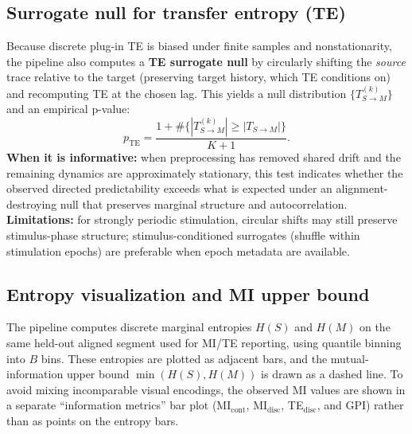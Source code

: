 \documentclass[11pt]{article}
\begin{document}
\subsection{Surrogate null for transfer entropy (TE)}
Because discrete plug-in TE is biased under finite samples and nonstationarity, the pipeline also computes a \textbf{TE surrogate null} by circularly shifting the \emph{source} trace relative to the target (preserving target history, which TE conditions on) and recomputing TE at the chosen lag. This yields a null distribution $\{T^{(k)}_{S\to M}\}$ and an empirical p-value:
\[
p_{\mathrm{TE}}=\frac{1+\#\{|T^{(k)}_{S\to M}|\ge |T_{S\to M}|\}}{K+1}.
\]
\textbf{When it is informative:} when preprocessing has removed shared drift and the remaining dynamics are approximately stationary, this test indicates whether the observed directed predictability exceeds what is expected under an alignment-destroying null that preserves marginal structure and autocorrelation. \textbf{Limitations:} for strongly periodic stimulation, circular shifts may still preserve stimulus-phase structure; stimulus-conditioned surrogates (shuffle within stimulation epochs) are preferable when epoch metadata are available.

\subsection{Entropy visualization and MI upper bound}
The pipeline computes discrete marginal entropies $H(S)$ and $H(M)$ on the same held-out aligned segment used for MI/TE reporting, using quantile binning into $B$ bins. These entropies are plotted as adjacent bars, and the mutual-information upper bound $\min(H(S),H(M))$ is drawn as a dashed line. To avoid mixing incomparable visual encodings, the observed MI values are shown in a separate ``information metrics'' bar plot (MI$_{\mathrm{cont}}$, MI$_{\mathrm{disc}}$, TE$_{\mathrm{disc}}$, and GPI) rather than as points on the entropy bars.
\end{document}
